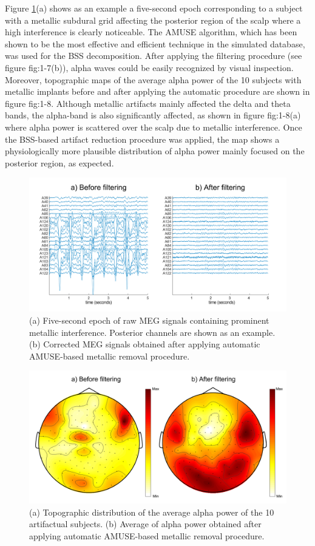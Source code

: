 Figure \ref{fig:1-7}(a) shows as an example a five-second epoch corresponding to a subject with a metallic subdural grid affecting the posterior region of the scalp where a high interference is clearly noticeable. The AMUSE algorithm, which has been shown to be the most effective and efficient technique in the simulated database, was used for the BSS decomposition. After applying the filtering procedure (see figure {fig:1-7}(b)), alpha waves could be easily recognized by visual inspection. Moreover, topographic maps of the average alpha power of the 10 subjects with metallic implants before and after applying the automatic procedure are shown in figure {fig:1-8}. Although metallic artifacts mainly affected the delta and theta bands, the alpha-band is also significantly affected, as shown in figure {fig:1-8}(a) where alpha power is scattered over the scalp due to metallic interference. Once the BSS-based artifact reduction procedure was applied, the map shows a physiologically more plausible distribution of alpha power mainly focused on the posterior region, as expected.

\begin{figure}[ht]
\centering
\includegraphics[width=1\textwidth]{Images/fig1-7.png}
\caption{(a) Five-second epoch of raw MEG signals containing prominent metallic interference. Posterior channels are shown as an example. (b) Corrected MEG signals obtained after applying automatic AMUSE-based metallic removal procedure.}
\label{fig:1-7}
\end{figure}  

\begin{figure}[ht]
\centering
\includegraphics[width=1\textwidth]{Images/fig1-8.png}
\caption{(a) Topographic distribution of the average alpha power of the 10 artifactual subjects. (b) Average of alpha power obtained after applying automatic AMUSE-based metallic removal procedure.}
\label{fig:1-8}
\end{figure} 

